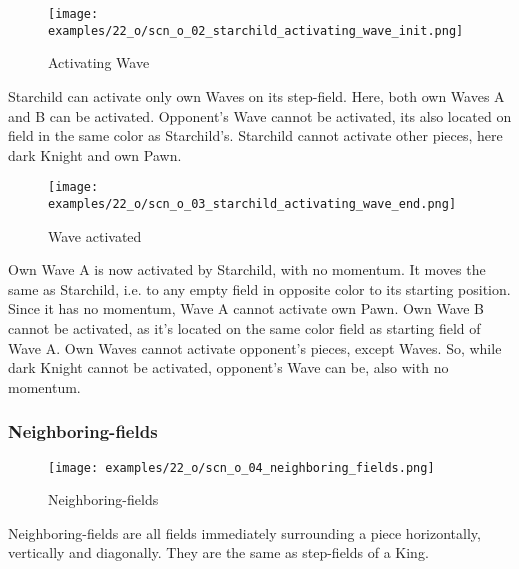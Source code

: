 \vspace*{-1.1\baselineskip}
\noindent
\begin{figure}[!h]
\texttt{[image: examples/22\_o/scn\_o\_02\_starchild\_activating\_wave\_init.png]}
\caption{Activating Wave}
\label{fig:scn_o_02_starchild_activating_wave_init}
\end{figure}

Starchild can activate only own Waves on its step-field. Here, both own Waves A and B can
be activated. Opponent's Wave cannot be activated, its also located on field in the same
color as Starchild's. Starchild cannot activate other pieces, here dark Knight and own Pawn.

\clearpage %

\vspace*{-2.1\baselineskip}
\noindent
\begin{figure}[!h]
\texttt{[image: examples/22\_o/scn\_o\_03\_starchild\_activating\_wave\_end.png]}
\caption{Wave activated}
\label{fig:scn_o_03_starchild_activating_wave_end}
\end{figure}

Own Wave A is now activated by Starchild, with no momentum. It moves the same as Starchild,
i.e. to any empty field in opposite color to its starting position. Since it has no momentum,
Wave A cannot activate own Pawn. Own Wave B cannot be activated, as it's located on the same
color field as starting field of Wave A. Own Waves cannot activate opponent's pieces, except
Waves. So, while dark Knight cannot be activated, opponent's Wave can be, also with no
momentum.

\clearpage %

\subsubsection*{Neighboring-fields}

\vspace*{-0.9\baselineskip}
\noindent
\begin{wrapfigure}[5]{l}{0.4\textwidth}
\centering
\texttt{[image: examples/22\_o/scn\_o\_04\_neighboring\_fields.png]}
\caption{Neighboring-fields}
\label{fig:scn_o_04_neighboring_fields}
\end{wrapfigure}
Neighboring-fields are all fields immediately surrounding a piece horizontally, vertically
and diagonally. They are the same as step-fields of a King.

